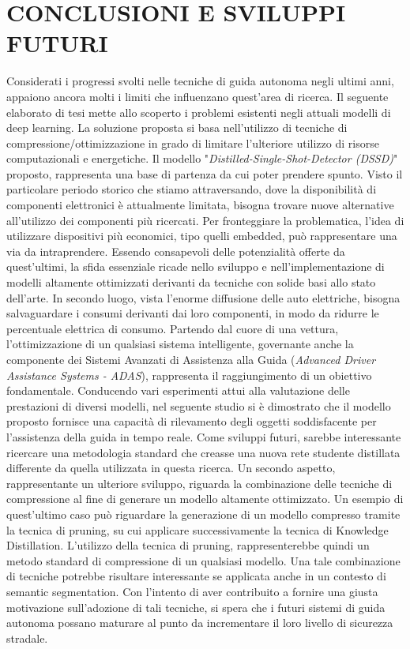 
\chapter{CONCLUSIONI E SVILUPPI FUTURI}
\label{Capitolo5}
\thispagestyle{empty}
Considerati i progressi svolti nelle tecniche di guida autonoma negli ultimi anni, appaiono ancora molti i limiti che influenzano quest'area di ricerca. Il seguente elaborato di tesi mette allo scoperto i problemi esistenti negli attuali modelli di deep learning. La soluzione proposta si basa nell'utilizzo di tecniche di compressione/ottimizzazione in grado di limitare l'ulteriore utilizzo di risorse computazionali e energetiche. Il modello "\emph{Distilled-Single-Shot-Detector (DSSD)}" proposto, rappresenta una base di partenza da cui poter prendere spunto. Visto il particolare periodo storico che stiamo attraversando, dove la disponibilità di componenti elettronici è attualmente limitata, bisogna trovare nuove alternative all'utilizzo dei componenti più ricercati. Per fronteggiare la problematica, l'idea di utilizzare dispositivi più economici, tipo quelli embedded, può rappresentare una via da intraprendere.
Essendo consapevoli delle potenzialità offerte da quest'ultimi, la sfida essenziale ricade nello sviluppo e nell'implementazione di modelli altamente ottimizzati derivanti da tecniche con solide basi allo stato dell'arte. In secondo luogo, vista l'enorme diffusione delle auto elettriche, bisogna salvaguardare i consumi derivanti dai loro componenti, in modo da ridurre le percentuale elettrica di consumo. Partendo dal cuore di una vettura, l'ottimizzazione di un qualsiasi sistema intelligente, governante anche la componente dei Sistemi Avanzati di Assistenza 
alla Guida (\emph{Advanced Driver Assistance Systems - ADAS}),  rappresenta il raggiungimento di un obiettivo fondamentale. Conducendo vari esperimenti attui alla valutazione delle prestazioni di diversi modelli, nel seguente studio si è dimostrato che il modello proposto fornisce una capacità di rilevamento degli oggetti soddisfacente per l'assistenza della guida in tempo reale.
Come sviluppi futuri, sarebbe interessante ricercare una metodologia standard che creasse una nuova rete studente distillata differente da quella utilizzata in questa ricerca. Un secondo aspetto, rappresentante un ulteriore sviluppo, riguarda la combinazione delle tecniche di compressione al fine di generare un modello altamente ottimizzato. Un esempio di quest'ultimo caso può riguardare la generazione di un modello compresso tramite la tecnica di pruning, su cui applicare successivamente la tecnica di Knowledge Distillation. L'utilizzo della tecnica di pruning, rappresenterebbe quindi un metodo standard di compressione di un qualsiasi modello. Una tale combinazione di tecniche potrebbe risultare interessante se applicata anche in un contesto di semantic segmentation. Con l'intento di aver contribuito a fornire una giusta motivazione sull'adozione di tali tecniche, si spera che i futuri sistemi di guida autonoma possano maturare al punto da incrementare il loro livello di sicurezza stradale.



